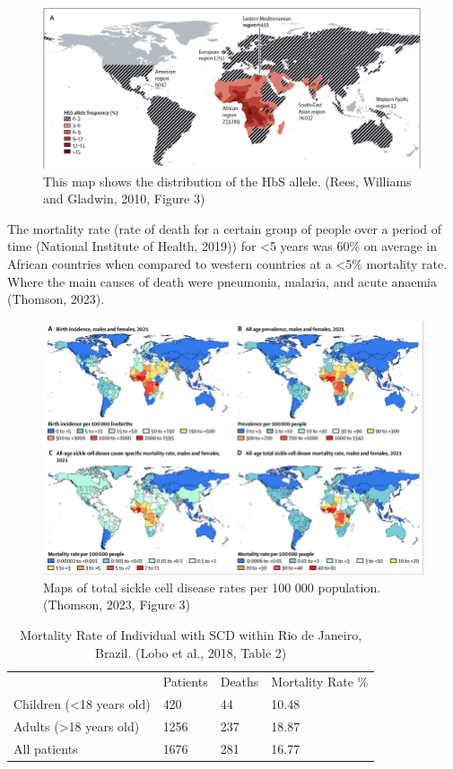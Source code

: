 \documentclass{mva_style}
\begin{document}
\begin{figure}
    \centering
    \includegraphics[width=0.8\linewidth]{img/Rees, Williams and Gladwin, 2010, Figure 3.png}
    \caption{ This map shows the distribution of the HbS allele. (Rees, Williams and Gladwin, 2010, Figure 3)}
    \label{fig:enter-label}
\end{figure}


The mortality rate (rate of death for a certain group of people over a period of time (National Institute of Health, 2019)) for <5 years was 60\% on average in African countries when compared to western countries at a <5\% mortality rate. Where the main causes of death were pneumonia, malaria, and acute anaemia (Thomson, 2023).

\begin{figure}
    \centering
    \includegraphics[width=0.8\linewidth]{img/Thomson, 2023, Figure 3.png}
    \caption{Maps of total sickle cell disease rates per 100 000 population. (Thomson, 2023, Figure 3)}
    \label{fig:enter-label}
\end{figure}

\begin{table}[]
    \begin{center}
        \begin{tabular}{llll}
         & Patients & Deaths & Mortality Rate \% \\
        Children (\textless{}18 years old) & 420 & 44 & 10.48 \\
        Adults (\textgreater{}18 years old) & 1256 & 237 & 18.87 \\
        All patients & 1676 & 281 & 16.77
        \end{tabular}
    \end{center}
    \caption{Mortality Rate of Individual with SCD within Rio de Janeiro, Brazil. (Lobo et al., 2018, Table 2)}
    \label{tab:my-table}
\end{table}
\end{document}
